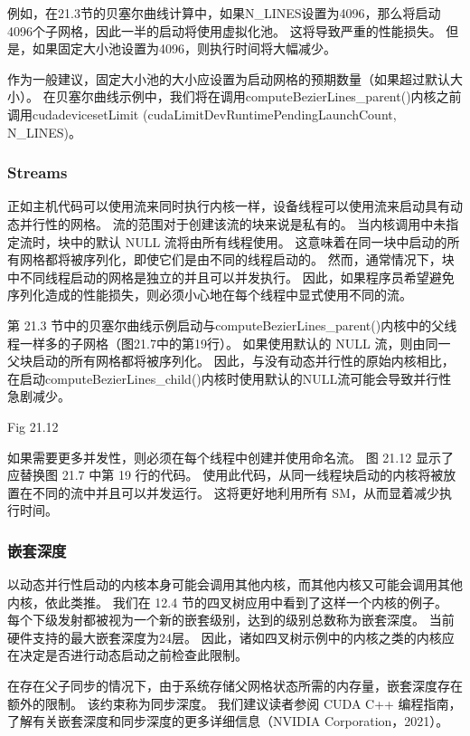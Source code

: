 例如，在21.3节的贝塞尔曲线计算中，如果N\_LINES设置为4096，那么将启动4096个子网格，因此一半的启动将使用虚拟化池。 
这将导致严重的性能损失。 但是，如果固定大小池设置为4096，则执行时间将大幅减少。

作为一般建议，固定大小池的大小应设置为启动网格的预期数量（如果超过默认大小）。 
在贝塞尔曲线示例中，我们将在调用computeBezierLines\_parent()内核之前调用cudadevicesetLimit (cudaLimitDevRuntimePendingLaunchCount, N\_LINES)。

\subsubsection{Streams}
正如主机代码可以使用流来同时执行内核一样，设备线程可以使用流来启动具有动态并行性的网格。 
流的范围对于创建该流的块来说是私有的。 当内核调用中未指定流时，块中的默认 NULL 流将由所有线程使用。 
这意味着在同一块中启动的所有网格都将被序列化，即使它们是由不同的线程启动的。 
然而，通常情况下，块中不同线程启动的网格是独立的并且可以并发执行。 
因此，如果程序员希望避免序列化造成的性能损失，则必须小心地在每个线程中显式使用不同的流。

第 21.3 节中的贝塞尔曲线示例启动与computeBezierLines\_parent()内核中的父线程一样多的子网格（图21.7中的第19行）。 
如果使用默认的 NULL 流，则由同一父块启动的所有网格都将被序列化。 
因此，与没有动态并行性的原始内核相比，
在启动computeBezierLines\_child()内核时使用默认的NULL流可能会导致并行性急剧减少。

{\color{red} Fig 21.12}

如果需要更多并发性，则必须在每个线程中创建并使用命名流。 图 21.12 显示了应替换图 21.7 中第 19 行的代码。 
使用此代码，从同一线程块启动的内核将被放置在不同的流中并且可以并发运行。 这将更好地利用所有 SM，从而显着减少执行时间。

\subsubsection{嵌套深度}
以动态并行性启动的内核本身可能会调用其他内核，而其他内核又可能会调用其他内核，依此类推。 
我们在 12.4 节的四叉树应用中看到了这样一个内核的例子。 每个下级发射都被视为一个新的嵌套级别，达到的级别总数称为嵌套深度。 
当前硬件支持的最大嵌套深度为24层。 因此，诸如四叉树示例中的内核之类的内核应在决定是否进行动态启动之前检查此限制。

在存在父子同步的情况下，由于系统存储父网格状态所需的内存量，嵌套深度存在额外的限制。 该约束称为同步深度。 
我们建议读者参阅 CUDA C++ 编程指南，了解有关嵌套深度和同步深度的更多详细信息（NVIDIA Corporation，2021）。

